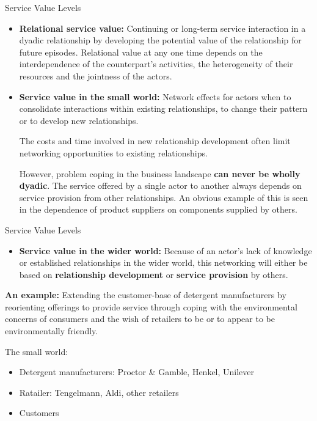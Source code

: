 \documentclass{beamer}
\begin{document}
\begin{frame}{Service Value Levels}\small

\begin{itemize}
\item \textbf{Relational service value:} Continuing or long-term service
  interaction in a dyadic relationship by developing the potential value of
  the relationship for future episodes.  Relational value at any one time
  depends on the interdependence of the counterpart's activities, the
  heterogeneity of their resources and the jointness of the actors.

\item \textbf{Service value in the small world:} Network effects for actors
  when to consolidate interactions within existing relationships, to change
  their pattern or to develop new relationships.

The costs and time involved in new relationship development often limit
networking opportunities to existing relationships.

However, problem coping in the business landscape \textbf{can never be wholly
  dyadic}.  The service offered by a single actor to another always depends on
service provision from other relationships.  An obvious example of this is
seen in the dependence of product suppliers on components supplied by others.
\end{itemize}
\end{frame}

\begin{frame}{Service Value Levels}\small

\begin{itemize}
\item \textbf{Service value in the wider world:} Because of an actor's lack of
  knowledge or established relationships in the wider world, this networking
  will either be based on \textbf{relationship development} or \textbf{service
    provision} by others.
\end{itemize}

\textbf{An example:} Extending the customer-base of detergent manufacturers by
reorienting offerings to provide service through coping with the environmental
concerns of consumers and the wish of retailers to be or to appear to be
environmentally friendly.

The small world: 
\begin{itemize}
\item Detergent manufacturers: Proctor \& Gamble, Henkel, Unilever
\item Ratailer: Tengelmann, Aldi, other retailers
\item Customers 
\end{itemize}
\end{frame}
\end{document}

